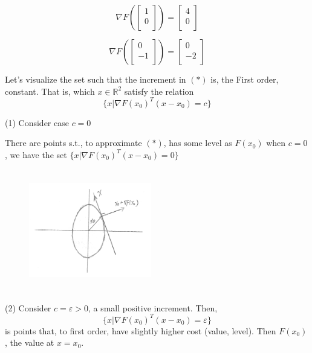 \begin{displaymath}
\nabla F \left( \begin{bmatrix} 1\\ 0\\ \end{bmatrix} \right)  =
\begin{bmatrix} 4\\ 0\\ \end{bmatrix}
\end{displaymath}

\begin{displaymath}
\nabla F \left( \begin{bmatrix} 0\\ -1\\ \end{bmatrix} \right)  =
\begin{bmatrix} 0\\ -2\\ \end{bmatrix}
\end{displaymath}

Let's visualize the set such that the increment in $(*)$ is, the First order, constant. That is, which $x \in \mathbb{R}^2$ satisfy the relation
$$\{x | \nabla F(x_0)^{T} (x-x_0) = c\}$$


(1) Consider case $c=0$

There are points s.t., to approximate $(*)$, has some level as $F(x_0)$ when $c=0$, we have the set $\{x | \nabla F(x_0)^{T} (x-x_0) = 0\}$

\begin{figure}
	\centering
	\includegraphics[width=2.1in,height=2.1in]{figures/ch02/p60-2.jpg}
\end{figure}


(2) Consider $c = \varepsilon > 0$, a small positive increment. Then, 
$$\{x | \nabla F(x_0)^{T} (x-x_0) = \varepsilon\}$$
is points that, to first order, have slightly higher cost (value, level). Then $F(x_0)$, the value at $x=x_0$.

